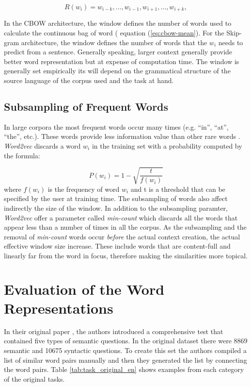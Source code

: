 \begin{equation*}
R(w_i) =
w_{i-k},\ldots,w_{i-1},w_{i+1},\ldots,w_{i+k},
\end{equation*}

In  the \ac{CBOW} architecture, the window defines the number of words used to
calculate the continuous bag of word ( equation (\ref{eq:cbow-mean}).  For
the Skip-gram architecture, the window defines  the number of words that the
$w_i$ needs to predict from a sentence.  Generally speaking,  larger
context generally provide better word representation but at expense of
computation time. The window  is generally set empirically its  will depend
on the grammatical structure of the source language of the corpus used and the task at hand.


\subsection{Subsampling of Frequent Words}
\label{sec:sub-hs}

In large corpora the most frequent words occur many times (e.g.
``in'', ``at'', ``the'', etc.). These words  provide  less information value
than other rare words  \cite{MikolovSCCD13}.  \textit{Word2vec} discards a
word $w_i$ in the training set with a probability computed by the formula:

\begin{equation}
  \label{eq:w2v-subsampling}
  P(w_i)= 1 - \sqrt{\frac{t}{f(w_i)}}
\end{equation}
where $f(w_i)$  is the frequency of word $w_i$ and t is a threshold that can
be specified  by the user at training time. The subsampling of words also
affect indirectly the size of the window. In addition to the subsampling
paramter, \textit{Word2vec} offer a parameter called 
\textit{min-count} which discards all the words that appear less than a
number of times in all the corpus.   As the subsampling and the removal of
\textit{min-count} words occur  \emph{before} the actual context creation,
the actual effective window size increase. These include words that are
content-full and linearly far from the word in focus, therefore making the similarities more topical.


\section{Evaluation of the Word Representations}
\label{sec:w2v-evaluation-word-repr}

In their original paper \cite{DBLP:journals/corr/abs-1301-3781}, the authors
introduced a comprehensive test that contained five types of semantic
questions. In the original dataset  there were 8869 semantic and 10675
syntactic questions. To create this set the authors compiled a list of
similar word pairs manually and then they generated the list by
connecting the word pairs. Table \ref{tab:task_original_en} shows  
examples from each category of the original tasks. 

